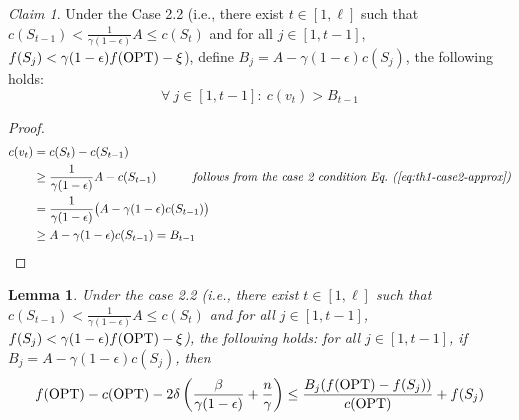 \documentclass[10pt]{article} %
\newtheorem{lemma}[theorem]{Lemma}
\theoremstyle{remark}
\newtheorem{claim}[theorem]{Claim}
\newcommand{\OPT}{{\rm OPT}}
\begin{document}
\begin{claim}
\label{claim:cost-St-approx}
Under the Case 2.2 (i.e., 
there exist $t\in[1, \ell]$ such that
$c(S_{t-1})< \frac{1}{\gamma (1-\epsilon)} A  \leq c(S_t)$
and for all $j\in[1, t-1]$, $f(S_{j}) < \gamma (1-\epsilon)f(\OPT)-\xi$), define $B_j=A-\gamma(1-\epsilon) c(S_{j})$, the following holds: 
\[ \forall~j \in [1, t-1]:~ c(v_t) > B_{t-1}\]
\end{claim}

\begin{proof}

\begin{align*}
c(v_t) &= c(S_t) - c(S_{t-1})\\
&\geq \frac{1}{\gamma(1-\epsilon)}A- c(S_{t-1}) \quad\quad\quad {\mbox{\it follows from the case 2 condition Eq.~(\ref{eq:th1-case2-approx})}} \\
& =  \frac{1}{\gamma(1-\epsilon)}\big(A-\gamma (1-\epsilon)c(S_{t-1})\big) \\
&\geq  A- \gamma (1-\epsilon)c(S_{t-1}) =  B_{t-1}
\end{align*}


\end{proof}


\begin{lemma} 
\label{lem:h-upper-bound-approx}
Under the case 2.2 (i.e., 
there exist $t\in[1, \ell]$ such that
$c(S_{t-1})< \frac{1}{\gamma (1-\epsilon)} A  \leq c(S_t)$
and for all $j\in[1, t-1]$, $f(S_{j}) < \gamma (1-\epsilon)f(\OPT)-\xi$), the following
holds:
for all $j\in [1,t-1]$,
if $B_j=A-\gamma(1-\epsilon) c(S_{j})$, then
\[ 
   f(\OPT) - c(\OPT) - 2\delta\left(\frac{\beta}{\gamma(1-\epsilon)}+ \frac{n}{\gamma}\right) \leq \frac{B_j(f(\OPT) - f(S_{j}))}{c(\OPT)} +f(S_{j}) 
\]
\end{lemma}
\end{document}
